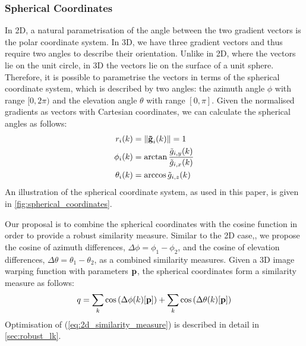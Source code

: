 \subsubsection{Spherical Coordinates}\label{subsubsec:cosine_spherical}
In 2D, a natural parametrisation of the angle between the two gradient vectors
is the polar coordinate system. In 3D, we have three gradient vectors and thus
require two angles to describe their orientation. Unlike in 2D, where the
vectors lie on the unit circle, in 3D the vectors lie on the surface of a unit
sphere. Therefore, it is possible to parametrise the vectors in terms of the
spherical coordinate system, which is described by two angles: the azimuth angle
$\phi$ with range $[0, 2\pi)$ and the elevation angle $\theta$ with range
$[0, \pi]$. Given the normalised gradients as vectors with Cartesian
coordinates, we can calculate the spherical angles as follows:
\begin{equation}\label{eq:cartesian_to_spherical}
    \begin{aligned}
        r_i(k)      &= \lVert \boldsymbol{\mathbf{\tilde{g}}}_{i}(k) \rVert = 1            \\
        \phi_i(k)   &= \arctan{\frac{\tilde{g}_{i,y}(k)}{\tilde{g}_{i,x}(k)}} \\
        \theta_i(k) &= \arccos{\tilde{g}_{i,z}(k)}
    \end{aligned}
\end{equation}
An illustration of the spherical coordinate system, as used in this paper, is
given in \cref{fig:spherical_coordinates}.

Our proposal is to combine the spherical coordinates with the cosine function in
order to provide a robust similarity measure. Similar to the 2D case,, we
propose the cosine of azimuth differences, $\Delta \phi = \phi_1 - \phi_2$, and
the cosine of elevation differences, $\Delta \theta = \theta_1 - \theta_2$, as a
combined similarity measures. Given a 3D image warping function with parameters
$\boldsymbol{\mathbf{p}}$, the spherical coordinates form a similarity measure as follows:
\begin{equation}\label{eq:spherical_similarity_measure}
    q = \sum_k \cos \left(\Delta \phi(k)[\boldsymbol{\mathbf{p}}]\right) + \sum_k \cos \left(\Delta \theta(k)[\boldsymbol{\mathbf{p}}]\right)
\end{equation}
Optimisation of (\ref{eq:2d_similarity_measure}) is described in detail in
\cref{sec:robust_lk}.

